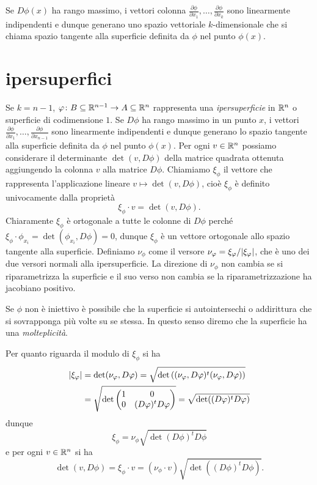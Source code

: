 Se $D\phi(x)$ ha rango massimo, i vettori colonna 
$\frac{\partial \phi}{\partial x_1},\dots,\frac{\partial \phi}{\partial x_k}$
sono linearmente indipendenti e dunque 
generano uno spazio vettoriale $k$-dimensionale 
che si chiama spazio tangente alla superficie definita da $\phi$ nel punto $\phi(x)$.


\section{ipersuperfici}

Se $k=n-1$, $\varphi\colon B\subseteq {\mathbb R}^{n-1} \to A\subseteq {\mathbb R}^n$ 
rappresenta una \emph{ipersuperficie} in ${\mathbb R}^n$ o superficie di codimensione $1$.
Se $D\phi$ ha rango massimo in un punto $x$, 
i vettori $\frac{\partial \phi}{\partial x_1},\dots,\frac{\partial \phi}{\partial x_{n-1}}$ 
sono linearmente indipendenti e dunque
generano lo spazio tangente alla superficie definita da $\phi$ nel punto $\phi(x)$.
Per ogni $v\in {\mathbb R}^n$ possiamo considerare il determinante $\det(v, D\phi)$ 
della matrice quadrata ottenuta aggiungendo la colonna $v$ alla matrice $D\phi$.
Chiamiamo $\xi_\phi$ il vettore che rappresenta l'applicazione lineare $v\mapsto \det(v, D\phi)$, 
cioè $\xi_\phi$ è definito univocamente dalla proprietà
\[
  \xi_\phi \cdot v = \det(v,D\phi).
\]
Chiaramente $\xi_\phi$ è ortogonale a tutte le colonne di $D\phi$ perché
$\xi_\phi \cdot \phi_{x_i} = \det(\phi_{x_i}, D\phi) = 0$,
dunque $\xi_\phi$ è un vettore ortogonale allo spazio tangente alla superficie.
Definiamo $\nu_\phi$ come il versore $\nu_\varphi=\xi_\varphi/{\left|\xi_\varphi\right|}$, 
che è uno dei due versori normali alla ipersuperficie.
La direzione di $\nu_\phi$ non cambia se si riparametrizza la superficie
e il suo verso non cambia se la riparametrizzazione ha jacobiano positivo.

Se $\phi$ non è iniettivo è possibile che la superficie si autointersechi 
o addirittura che si sovrapponga più volte su se stessa. 
In questo senso diremo che la superficie ha una \emph{molteplicità}.

Per quanto riguarda il modulo di $\xi_\phi$ si ha 
\begin{align*}
   {\left|\xi_\varphi\right|} &= \det (\nu_\varphi, D\varphi)
   = \sqrt{\det {\left( (\nu_\varphi, D\varphi)^t (\nu_\varphi,D\varphi) \right)}}  \\
   &= \sqrt{\det \begin{pmatrix}
     1 & 0 \\
     0 & (D\varphi)^t D\varphi
   \end{pmatrix}}
  = \sqrt{\det((D\varphi)^t D\varphi)}
\end{align*}
dunque 
\[
  \xi_\phi = \nu_\phi \sqrt{\det (D\phi)^t D\phi}
\]
e per ogni $v\in {\mathbb R}^n$ si ha
\begin{equation}\label{eq:493444}
\det(v, D\phi)
= \xi_\phi \cdot v
= (\nu_\phi \cdot v) \sqrt{\det((D\phi)^t D\phi)}.
\end{equation}

